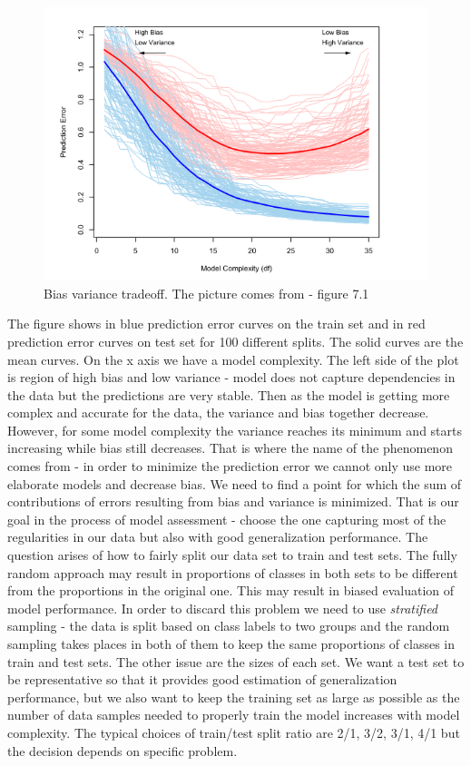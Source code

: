 \documentclass[shortabstract, english, mgr]{iithesis}
\begin{document}
\begin{figure}
\centering
\includegraphics[width=\textwidth]{images/BiasVarianceTrade.png}
\caption{Bias variance tradeoff. The picture comes from \cite{ESL2} - figure 7.1}
\label{fig:biasVarTrade}
\end{figure}

The figure shows in blue prediction error curves on the train set and in red prediction error curves on test set for 100 different splits. The solid curves are the mean curves. On the x axis we have a model complexity. The left side of the plot is region of high bias and low variance - model does not capture dependencies in the data but the predictions are very stable. Then as the model is getting more complex and accurate for the data, the variance and bias together decrease. However, for some model complexity the variance reaches its minimum and starts increasing while bias still decreases. That is where the name of the phenomenon comes from - in order to minimize the prediction error we cannot only use more elaborate models and decrease bias. We need to find a point for which the sum of contributions of errors resulting from bias and variance is minimized. That is our goal in the process of model assessment - choose the one capturing most of the regularities in our data but also with good generalization performance. The question arises of how to fairly split our data set to train and test sets. The fully random approach may result in proportions of classes in both sets to be different from the proportions in the original one. This may result in biased evaluation of model performance. In order to discard this problem we need to use \textit{stratified} sampling - the data is split based on class labels to two groups and the random sampling takes places in both of them to keep the same proportions of classes in train and test sets. The other issue are the sizes of each set. We want a test set to be representative so that it provides good estimation of generalization performance, but we also want to keep the training set as large as possible as the number of data samples needed to properly train the model increases with model complexity.  The typical choices of train/test split ratio are 2/1, 3/2, 3/1, 4/1 but the decision depends on specific problem.  
\end{document}
